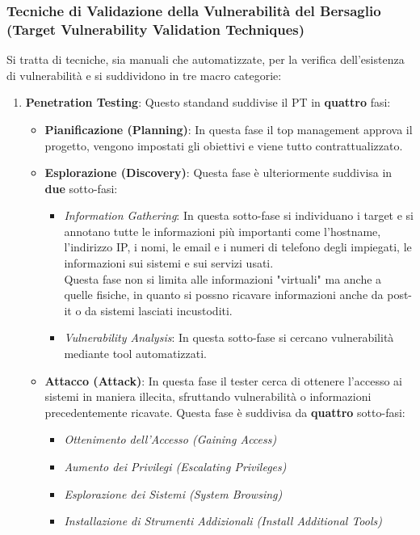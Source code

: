 \documentclass{article}
\begin{document}
\subsubsection{Tecniche di Validazione della Vulnerabilità del Bersaglio \\(Target Vulnerability Validation Techniques)}
Si tratta di tecniche, sia manuali che automatizzate, per la verifica dell’esistenza di vulnerabilità e si suddividono in tre macro categorie:
\begin{enumerate}
    \item \textbf{Penetration Testing}: Questo standand suddivise il PT in \textbf{quattro} fasi:
    \begin{itemize}
        \item \textbf{Pianificazione (Planning)}: In questa fase il top management approva il progetto, vengono impostati gli obiettivi e viene tutto contrattualizzato.

        \item \textbf{Esplorazione (Discovery)}: Questa fase è ulteriormente suddivisa in \textbf{due} sotto-fasi: 
        \begin{itemize}
            \item \textit{Information Gathering}: In questa sotto-fase si individuano i target e si annotano tutte le informazioni più importanti come l'hostname, l'indirizzo IP, i nomi, le email e i numeri di telefono degli impiegati, le informazioni sui sistemi e sui servizi usati.\\
            Questa fase non si limita alle informazioni "virtuali" ma anche a quelle fisiche, in quanto si possno ricavare informazioni anche da post-it o da sistemi lasciati incustoditi.

            \item \textit{Vulnerability Analysis}: In questa sotto-fase si cercano vulnerabilità mediante tool automatizzati.
        \end{itemize}

        \item \textbf{Attacco (Attack)}: In questa fase il tester cerca di ottenere l'accesso ai sistemi in maniera illecita, sfruttando vulnerabilità o informazioni precedentemente ricavate. Questa fase è suddivisa da \textbf{quattro} sotto-fasi:
        \begin{itemize}
            \item \textit{Ottenimento dell’Accesso (Gaining Access)}
            \item \textit{Aumento dei Privilegi (Escalating Privileges)}
            \item \textit{Esplorazione dei Sistemi (System Browsing)}
            \item \textit{Installazione di Strumenti Addizionali (Install Additional Tools)}
        \end{itemize}


\end{itemize}
\end{enumerate}
\end{document}
